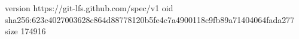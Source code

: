 version https://git-lfs.github.com/spec/v1
oid sha256:623c4027003628c864d88778120b5fe4c7a4900118c9fb89a71404064fada277
size 174916
